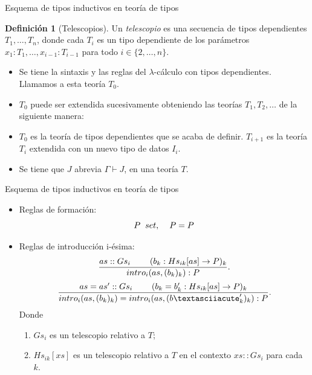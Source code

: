 \documentclass[dvipsnames, 8pt]{beamer} %
\theoremstyle{plain}
\theoremstyle{definition}
\newtheorem{defi}{Definición}
\begin{document}
\begin{frame}{Esquema de tipos inductivos en teoría de tipos}
    \begin{defi}[Telescopios]
        Un \emph{telescopio} es una secuencia de tipos dependientes \(T_{1}, \ldots, T_{n}\), donde cada \(T_{i}\) es un tipo dependiente de los parámetros \(x_{1}:T_{1}, \ldots, x_{i-1}:T_{i-1}\) para todo \(i \in \{2, \ldots, n\}\).
    \end{defi}\pause
    \begin{itemize}
        \item Se tiene la sintaxis y las reglas del $\lambda$-cálculo con tipos dependientes. Llamamos a esta teoría $T_{0}$. \pause
        \item $T_{0}$ puede ser extendida sucesivamente obteniendo las teorías $T_{1}, T_{2}, \ldots$ de la siguiente manera:\pause
        \item $T_{0}$ es la teoría de tipos dependientes que se acaba de definir. $T_{i+1}$ es la teoría $T_{i}$ extendida con un nuevo tipo de datos $I_{i}$.\pause
        \item Se tiene que $J$ abrevia $\Gamma\vdash J$, en una teoría $T$.
    \end{itemize}
\end{frame}

\begin{frame}{Esquema de tipos inductivos en teoría de tipos}
    \begin{itemize}
    \item Reglas de formación:
    \[P \hspace{2mm} set, \hspace{4mm} P=P\]\pause
    \item Reglas de introducción i-ésima:
      $$\frac{as::Gs_{i} \hspace{8mm} (b_{k}:Hs_{ik}[as]\to P)_{k}}{intro_{i}(as,(b_{k})_{k}) :P}.$$
      $$\frac{as=as'::Gs_{i} \hspace{8mm} (b_{k}=b'_{k}:Hs_{ik}[as]\to P)_{k}}{intro_{i}(as,(b_{k})_{k}) = intro_{i}(as,(b´'_{k})_{k}) :P}.$$\pause
    Donde\pause
        \begin{enumerate}
            \item $Gs_{i}$ es un telescopio relativo a $T$;\pause
            \item $Hs_{ik}[xs]$ es un telescopio relativo a $T$ en el contexto $xs::Gs_{i}$ para cada $k$.
        \end{enumerate}
    \end{itemize}
\end{frame}
\end{document}
